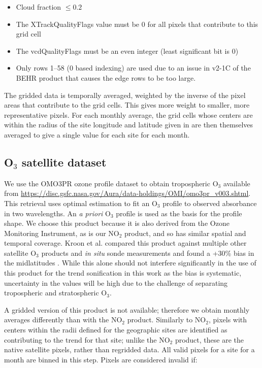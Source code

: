 \documentclass[a4paper,10pt,oneside]{article}
\newcommand{\ce}[1]{$\mathrm{#1}$}
\begin{document}
\begin{sloppy}
	\begin{itemize}
	\item Cloud fraction $\leq 0.2$
	\item The XTrackQualityFlags value must be 0 for all pixels that contribute to this grid cell
	\item The vcdQualityFlags must be an even integer (least significant bit is 0)
	\item Only rows 1--58 (0 based indexing) are used due to an issue in v2-1C of the BEHR product that causes the edge rows to be too large.
	\end{itemize}
	
	The gridded data is temporally averaged, weighted by the inverse of the pixel areas that contribute to the grid cells. This gives more weight to smaller, more representative pixels.  For each monthly average, the grid cells whose centers are within the radius of the site longitude and latitude given in \cite{russell12} are then themselves averaged to give a single value for each site for each month.

\subsection{O$_3$ satellite dataset}

	We use the OMO3PR ozone profile dataset to obtain tropospheric \ce{O_3} available from \url{https://disc.gsfc.nasa.gov/Aura/data-holdings/OMI/omo3pr_v003.shtml}.   This retrieval uses optimal estimation to fit an \ce{O_3} profile to observed absorbance in two wavelengths. An \emph{a priori} \ce{O_3} profile is used as the basis for the profile shape.  We choose this product because it is also derived from the Ozone Monitoring Instrument, as is our \ce{NO_2} product, and so has similar spatial and temporal coverage. Kroon et al. compared this product against multiple other satellite \ce{O_3} products and \emph{in situ} sonde measurements and found a +30\% bias in the midlatitudes  \cite{kroon11}. While this alone should not interfere significantly in the use of this product for the trend sonification in this work as the bias is systematic, uncertainty in the values will be high due to the challenge of separating tropospheric and stratospheric \ce{O_3}.
	
	A gridded version of this product is not available; therefore we obtain monthly averages differently than with the \ce{NO_2} product. Similarly to \ce{NO_2}, pixels with centers within the radii defined for the geographic sites are identified as contributing to the trend for that site; unlike the \ce{NO_2} product, these are the native satellite pixels, rather than regridded data. All valid pixels for a site for a month are binned in this step. Pixels are considered invalid if:
	

\end{sloppy}
\end{document}
